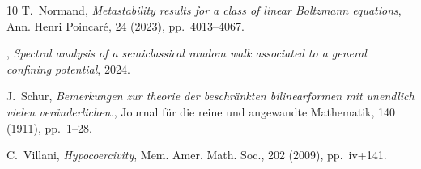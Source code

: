 \documentclass[12pt]{amsart}
\numberwithin{equation}{section}
\numberwithin{figure}{section}
\begin{document}
\begin{thebibliography}{10}
{\sc T.~Normand}, {\em Metastability results for a class of linear {B}oltzmann equations}, Ann. Henri Poincar\'{e}, 24 (2023), pp.~4013--4067.

\bysame, {\em Spectral analysis of a semiclassical random walk associated to a general confining potential}, 2024.

{\sc J.~Schur}, {\em Bemerkungen zur theorie der beschränkten bilinearformen mit unendlich vielen veränderlichen.}, Journal für die reine und angewandte Mathematik, 140 (1911), pp.~1--28.

{\sc C.~Villani}, {\em Hypocoercivity}, Mem. Amer. Math. Soc., 202 (2009), pp.~iv+141.
\end{thebibliography}
\end{document}
